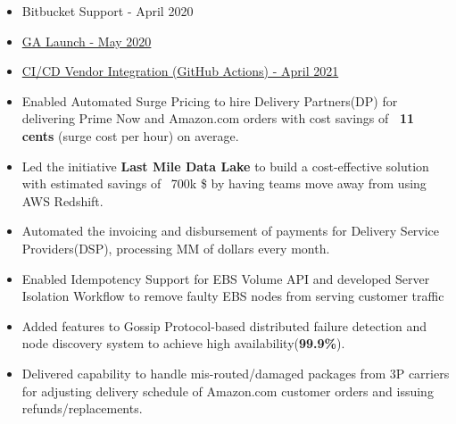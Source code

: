 \documentclass[10pt]{article}
\begin{document}
\begin{minipage}[t]{0.58\textwidth}
\begin{flushright}
\begin{itemize}
\item Bitbucket Support - April 2020
\item \href{https://aws.amazon.com/blogs/aws/find-your-most-expensive-lines-of-code-amazon-codeguru-is-now-generally-available/}{GA Launch - May 2020}
\item \href{https://aws.amazon.com/blogs/aws/amazon_codeguru_reviewer_updates_new_java_detectors_and_cicd_integration_with_github_actions/}{CI/CD Vendor Integration (GitHub Actions) - April 2021}
\end{itemize}
\begin{itemize}
\item Enabled Automated Surge Pricing to hire Delivery Partners(DP) for delivering Prime Now and Amazon.com orders with cost savings of {\bf ~11 cents} (surge cost per hour) on average.
\item Led the initiative {\bf Last Mile Data Lake} to build a cost-effective solution with estimated savings of ~700k \$ by having teams move away from using AWS Redshift.
\item Automated the invoicing and disbursement of payments for Delivery Service Providers(DSP), processing MM of dollars every month.
\end{itemize}

\begin{itemize}
\item Enabled Idempotency Support for EBS Volume API and developed Server Isolation Workflow to remove faulty EBS nodes from serving customer traffic
\item Added features to Gossip Protocol-based distributed failure detection and node discovery system to achieve high availability({\bf 99.9\%}).
\end{itemize}
\begin{itemize}
\item Delivered capability to handle mis-routed/damaged packages from 3P carriers for adjusting delivery schedule of Amazon.com customer orders and issuing refunds/replacements. 
\end{itemize}
\end{flushright}


\end{minipage}
\end{document}
